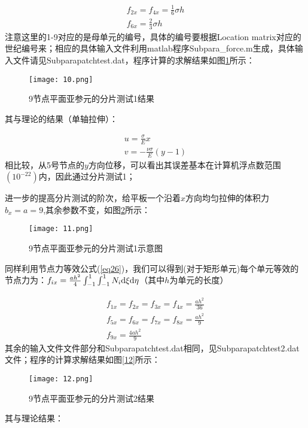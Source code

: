 \documentclass[forprint]{WHUBachelor}
\begin{document}
\begin{equation}
\begin{array}{c}
f_{2x}=f_{4x}=\frac{1}{6}\sigma h\\
f_{6x}=\frac{2}{3}\sigma h
\end{array}\label{eq27}
\end{equation}
注意这里的1-9对应的是母单元的编号，具体的编号要根据Location matrix对应的世纪编号来；相应的具体输入文件利用matlab程序Subpara\_force.m生成，具体输入文件请见Subparapatchtest.dat，程序计算的求解结果如图\ref{f10}所示：

\begin{figure}[H]
\centering  
\texttt{[image: 10.png]} 
\caption{9节点平面亚参元的分片测试1结果} 
\label{f10} 
\end{figure}其与理论的结果（单轴拉伸）：

\begin{equation}
\begin{array}{c}
u=\frac{\sigma}{E}x\\
v=-\frac{\nu\sigma}{E}(y-1)
\end{array}\label{eq28}
\end{equation}
相比较，从5号节点的$y$方向位移，可以看出其误差基本在计算机浮点数范围$(10^{-22})$内，因此通过分片测试1；

进一步的提高分片测试的阶次，给平板一个沿着$x$方向均匀拉伸的体积力$b_{x}=a=9$,其余参数不变，如图\ref{f11}所示：

\begin{figure}[H]
\centering  
\texttt{[image: 11.png]} 
\caption{9节点平面亚参元的分片测试1示意图} 
\label{f11} 
\end{figure}

同样利用节点力等效公式(\ref{eq26})，我们可以得到(对于矩形单元)每个单元等效的节点力为：$f_{ix}=\frac{ah^{2}}{4}\int_{-1}^{1}\int_{-1}^{1}N_{i}{\rm d}\xi{\rm d\eta}$（其中$h$为单元的长度）

\begin{equation}
\begin{array}{c}
f_{1x}=f_{2x}=f_{3x}=f_{4x}=\frac{ah^{2}}{36}\\
f_{5x}=f_{6x}=f_{7x}=f_{8x}=\frac{ah^{2}}{9}\\
f_{9x}=\frac{4ah^{2}}{9}
\end{array}\label{eq29}
\end{equation}
其余的输入文件文件部分和Subparapatchtest.dat相同，见Subparapatchtest2.dat文件；程序的计算求解结果如图\ref{12}所示：

\begin{figure}[H]
\centering  
\texttt{[image: 12.png]} 
\caption{9节点平面亚参元的分片测试2结果} 
\label{f12} 
\end{figure}其与理论结果：
\end{document}
